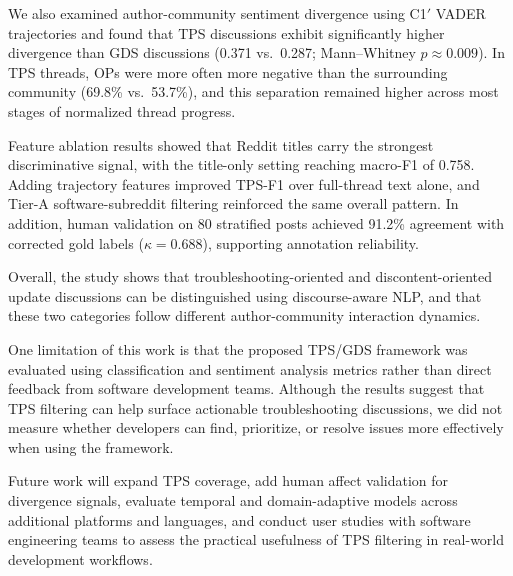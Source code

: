 \documentclass[conference]{IEEEtran}
\begin{document}
We also examined author-community sentiment divergence using C1$'$ VADER trajectories and found that TPS discussions exhibit significantly higher divergence than GDS discussions (0.371 vs.\ 0.287; Mann--Whitney $p \approx 0.009$). In TPS threads, OPs were more often more negative than the surrounding community (69.8\% vs.\ 53.7\%), and this separation remained higher across most stages of normalized thread progress.

Feature ablation results showed that Reddit titles carry the strongest discriminative signal, with the title-only setting reaching macro-F1 of 0.758. Adding trajectory features improved TPS-F1 over full-thread text alone, and Tier-A software-subreddit filtering reinforced the same overall pattern. In addition, human validation on 80 stratified posts achieved 91.2\% agreement with corrected gold labels ($\kappa{=}0.688$), supporting annotation reliability.

Overall, the study shows that troubleshooting-oriented and
discontent-oriented update discussions can be distinguished
using discourse-aware NLP, and that these two categories follow
different author-community interaction dynamics.

One limitation of this work is that the proposed TPS/GDS
framework was evaluated using classification and sentiment
analysis metrics rather than direct feedback from software
development teams. Although the results suggest that TPS
filtering can help surface actionable troubleshooting
discussions, we did not measure whether developers can find,
prioritize, or resolve issues more effectively when using the
framework.

Future work will expand TPS coverage, add human affect
validation for divergence signals, evaluate temporal and
domain-adaptive models across additional platforms and
languages, and conduct user studies with software engineering
teams to assess the practical usefulness of TPS filtering in
real-world development workflows.



\balance
\end{document}
